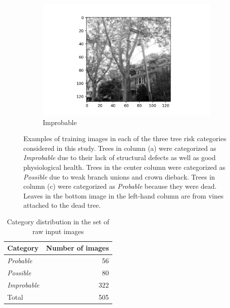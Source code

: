 \documentclass[NewProceedindgs, NoLineNumbers, SectionNumbers, letterpaper, SingleSpace, InsideFigs]{ascelike-new}
\begin{document}
\begin{figure}[ht]
\begin{subfigure}[t]{.325\linewidth}
    \includegraphics[width=\textwidth,keepaspectratio=true,angle=-90]{improbable-example-2}
    \caption{Improbable}
  \end{subfigure}
  \caption{Examples of training images in each of the three tree risk categories considered in this study.  Trees in  
     column (a) were categorized as \textit{Improbable} due to their lack of structural defects as well as good
    physiological health. Trees in the center column were categorized as \textit{Possible} due to weak branch unions and crown
    dieback. Trees in column (c)  were categorized as \textit{Probable} because they were dead. Leaves in the bottom
    image in the left-hand column are from vines attached to the dead tree.}
  \label{fig:raw_images}
\end{figure}

\begin{table}[h!]\small
    \centering
    \begin{tabular}{l r}\toprule
    \bf Category     & \bf Number of images  \\ \midrule
    \textit{Probable} & 56 \\
      \textit{Possible} & 80 \\
      \textit{Improbable} & 322\\\midrule
    Total & 505 \\\bottomrule
    \end{tabular}
    \caption{Category distribution  in the set of raw input images}
    \label{tab:classdist}
\end{table}
\end{document}
